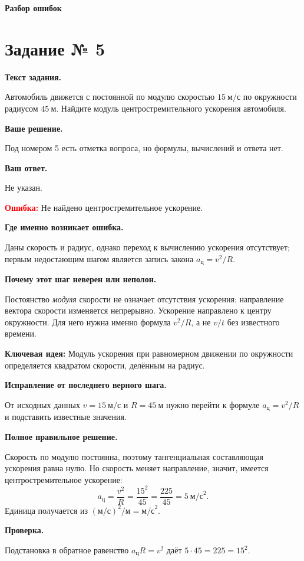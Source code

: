 \documentclass[11pt,a4paper]{article}
\newcommand{\reviewblock}[2]{\par\medskip\noindent\textbf{#1}\par\noindent#2\par}
\newcommand{\errorblock}[1]{\par\medskip\noindent\textcolor{red}{\textbf{Ошибка:}} #1\par}
\newcommand{\ideablock}[1]{\par\medskip\noindent\textcolor{blue!60!black}{\textbf{Ключевая идея:}} #1\par}
\begin{document}
\normalsize
\newpage
\thispagestyle{empty}
\vspace*{0.4\textheight}
\begin{center}
{\Huge\bfseries Разбор ошибок}
\end{center}
\vfill\newpage
{}\label{task:5}

\section*{Задание № 5}

\reviewblock{Текст задания.}{Автомобиль движется с постоянной по модулю скоростью $15\ \text{м/с}$ по окружности радиусом $45\ \text{м}$. Найдите модуль центростремительного ускорения автомобиля.}

\reviewblock{Ваше решение.}{Под номером 5 есть отметка вопроса, но формулы, вычислений и ответа нет.}

\reviewblock{Ваш ответ.}{Не указан.}

\errorblock{Не найдено центростремительное ускорение.}

\reviewblock{Где именно возникает ошибка.}{Даны скорость и радиус, однако переход к вычислению ускорения отсутствует; первым недостающим шагом является запись закона $a_{\text{ц}}=v^2/R$.}

\reviewblock{Почему этот шаг неверен или неполон.}{Постоянство \emph{модуля} скорости не означает отсутствия ускорения: направление вектора скорости изменяется непрерывно. Ускорение направлено к центру окружности. Для него нужна именно формула $v^2/R$, а не $v/t$ без известного времени.}

\ideablock{Модуль ускорения при равномерном движении по окружности определяется квадратом скорости, делённым на радиус.}

\reviewblock{Исправление от последнего верного шага.}{От исходных данных $v=15\ \text{м/с}$ и $R=45\ \text{м}$ нужно перейти к формуле $a_{\text{ц}}=v^2/R$ и подставить известные значения.}

\reviewblock{Полное правильное решение.}{Скорость по модулю постоянна, поэтому тангенциальная составляющая ускорения равна нулю. Но скорость меняет направление, значит, имеется центростремительное ускорение:
\[a_{\text{ц}}=\frac{v^2}{R}=\frac{15^2}{45}=\frac{225}{45}=5\ \text{м/с}^2.\]
Единица получается из $(\text{м/с})^2/\text{м}=\text{м/с}^2$.}

\reviewblock{Проверка.}{Подстановка в обратное равенство $a_{\text{ц}}R=v^2$ даёт $5\cdot45=225=15^2$.}
\end{document}
